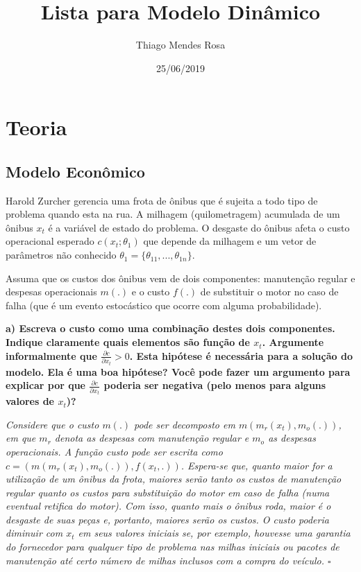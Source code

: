 \documentclass[12pt,a4paper]{article}
\title{Lista para Modelo Dinâmico}
\author{Thiago Mendes Rosa}
\date{25/06/2019}
\begin{document}
\maketitle

\hypertarget{teoria}{%
\section{Teoria}\label{teoria}}

\hypertarget{modelo-economico}{%
\subsection{Modelo Econômico}\label{modelo-economico}}

Harold Zurcher gerencia uma frota de ônibus que é sujeita a todo tipo de
problema quando esta na rua. A milhagem (quilometragem) acumulada de um
ônibus \(x_t\) é a variável de estado do problema. O desgaste do ônibus
afeta o custo operacional esperado \(c(x_t; \theta_1)\) que depende da
milhagem e um vetor de parâmetros não conhecido
\(\theta_1 = \{\theta_{11}, . . . , \theta_{1n}\}\).

Assuma que os custos dos ônibus vem de dois componentes: manutenção
regular e despesas operacionais \(m(.)\) e o custo \(f(.)\) de
substituir o motor no caso de falha (que é um evento estocástico que
ocorre com alguma probabilidade).

\textbf{a) Escreva o custo como uma combinação destes dois componentes.
Indique claramente quais elementos são função de \(x_t\). Argumente
informalmente que \(\frac{\partial c}{\partial x_t} > 0\). Esta hipótese
é necessária para a solução do modelo. Ela é uma boa hipótese? Você pode
fazer um argumento para explicar por que
\(\frac{\partial c}{\partial x_t}\) poderia ser negativa (pelo menos
para alguns valores de \(x_t\))?}

\emph{Considere que o custo \(m(.)\) pode ser decomposto em
\(m(m_r(x_t),m_o(.))\), em que \(m_r\) denota as despesas com manutenção
regular e \(m_o\) as despesas operacionais. A função custo pode ser
escrita como \(c=(m(m_r(x_t),m_o(.)),f(x_t,.))\). Espera-se que, quanto
maior for a utilização de um ônibus da frota, maiores serão tanto os
custos de manutenção regular quanto os custos para substituição do motor
em caso de falha (numa eventual retifica do motor). Com isso, quanto
mais o ônibus roda, maior é o desgaste de suas peças e, portanto,
maiores serão os custos. O custo poderia diminuir com \(x_t\) em seus
valores iniciais se, por exemplo, houvesse uma garantia do fornecedor
para qualquer tipo de problema nas milhas iniciais ou pacotes de
manutenção até certo número de milhas inclusos com a compra do veículo.
\(\square\)}
\end{document}
